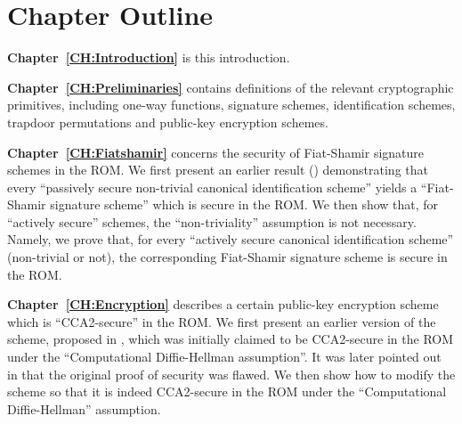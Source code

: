 

\section*{Chapter Outline}

{\bf Chapter~\ref{CH:Introduction}} is this introduction.

\medskip\noindent
{\bf Chapter~\ref{CH:Preliminaries}} contains definitions of the relevant
cryptographic primitives, including one-way functions, signature schemes,
identification schemes, trapdoor permutations and public-key encryption schemes. 

\medskip\noindent
{\bf Chapter~\ref{CH:Fiatshamir}} concerns the security of Fiat-Shamir
signature schemes in the ROM.  We first present an earlier result
(\cite{abdalla:fiatshamirrom}) 
demonstrating that every ``passively secure non-trivial canonical
identification scheme'' yields a ``Fiat-Shamir signature scheme'' which is
secure in the ROM. We then show that, for ``actively secure'' schemes, the
``non-triviality'' assumption is not necessary.  Namely, we prove that, for
every ``actively secure canonical identification scheme'' (non-trivial or
not), the corresponding Fiat-Shamir signature scheme is secure in the ROM.

\medskip\noindent
{\bf Chapter~\ref{CH:Encryption}} describes a certain public-key encryption
scheme which is ``CCA2-secure'' in the ROM. We first present an earlier
version of the scheme, proposed in \cite{bellare:minroms}, which was initially
claimed to be CCA2-secure in the ROM under the ``Computational Diffie-Hellman
assumption''. It was later pointed out in \cite{abdalla:dhies2} that the
original proof of security was flawed.
We then show how to modify the scheme so that it is indeed CCA2-secure in the
ROM under the ``Computational Diffie-Hellman'' assumption.

